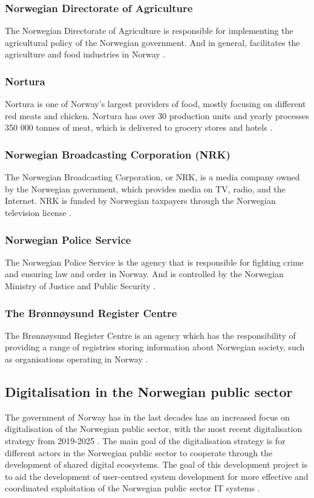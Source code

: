 \subsubsection{Norwegian Directorate of Agriculture}
The Norwegian Directorate of Agriculture is responsible for implementing the agricultural policy of the Norwegian government. And in general, facilitates the agriculture and food industries in Norway \cite{landbruksdirektoratet_2023}.

\subsubsection{Nortura}
Nortura is one of Norway's largest providers of food, mostly focusing on different red meats and chicken. Nortura has over 30 production units and yearly processes 350 000 tonnes of meat, which is delivered to grocery stores and hotels \cite{nortura_2023}.

\subsubsection{Norwegian Broadcasting Corporation (NRK)}
The Norwegian Broadcasting Corporation, or NRK, is a media company owned by the Norwegian government, which provides media on TV, radio, and the Internet. NRK is funded by Norwegian taxpayers through the Norwegian television license \cite{nrk_wiki_2023}.

\subsubsection{Norwegian Police Service}
The Norwegian Police Service is the agency that is responsible for fighting crime and ensuring law and order in Norway. And is controlled by the Norwegian Ministry of Justice and Public Security \cite{politiet_wiki_2023}.

\subsubsection{The Brønnøysund Register Centre}
The Brønnøysund Register Centre is an agency which has the responsibility of providing a range of registries storing information about Norwegian society, such as organisations operating in Norway \cite{brønnøysundregistrene_wiki_2023}.

\subsection{Digitalisation in the Norwegian public sector}
The government of Norway has in the last decades has an increased focus on digitalisation of the Norwegian public sector, with the most recent digitalisation strategy from 2019-2025 \cite{r_2019}. The main goal of the digitalisation strategy is for different actors in the Norwegian public sector to cooperate through the development of shared digital ecosystems. The goal of this development project is to aid the development of user-centred system development for more effective and coordinated exploitation of the Norwegian public sector IT systems \cite{r_2019}.

